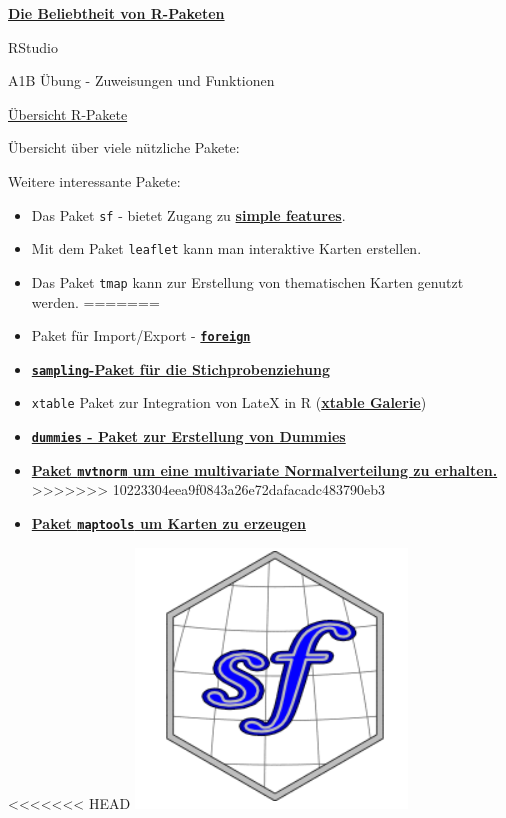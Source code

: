 \documentclass[ignorenonframetext,]{beamer}
\providecommand{\tightlist}{%
  \setlength{\itemsep}{0pt}\setlength{\parskip}{0pt}}
\begin{document}
\begin{frame}{\href{https://gallery.shinyapps.io/cran-gauge/}{\textbf{Die
Beliebtheit von R-Paketen}}}
\begin{frame}{RStudio}
\begin{frame}[fragile]{A1B Übung - Zuweisungen und Funktionen}
\begin{frame}{\href{https://www.youtube.com/watch?v=kKI9--Opmso}{Übersicht
R-Pakete}}
\begin{frame}[fragile]{Übersicht über viele nützliche Pakete:}
\begin{block}{Weitere interessante Pakete:}

\begin{itemize}
<<<<<<< HEAD
\tightlist
\item
  Das Paket \texttt{sf} - bietet Zugang zu
  \href{https://de.wikipedia.org/wiki/Simple_Feature_Access}{\textbf{simple
  features}}.
\item
  Mit dem Paket \texttt{leaflet} kann man interaktive Karten erstellen.
\item
  Das Paket \texttt{tmap} kann zur Erstellung von thematischen Karten
  genutzt werden.
=======
\item
  Paket für Import/Export -
  \href{http://cran.r-project.org/web/packages/foreign/foreign.pdf}{\textbf{\texttt{foreign}}}
\item
  \href{http://iase-web.org/documents/papers/icots8/ICOTS8_4J1_TILLE.pdf}{\textbf{\texttt{sampling}-Paket
  für die Stichprobenziehung}}
\item
  \texttt{xtable} Paket zur Integration von LateX in R
  (\href{http://cran.r-project.org/web/packages/xtable/vignettes/xtableGallery.pdf}{\textbf{xtable
  Galerie}})
\item
  \href{http://cran.r-project.org/web/packages/dummies/dummies.pdf}{\textbf{\texttt{dummies}
  - Paket zur Erstellung von Dummies}}
\item
  \href{http://cran.r-project.org/web/packages/mvtnorm/index.html}{\textbf{Paket
  \texttt{mvtnorm} um eine multivariate Normalverteilung zu erhalten. }}
>>>>>>> 10223304eea9f0843a26e72dafacadc483790eb3
\item
  \href{http://www.r-bloggers.com/tag/maptools/}{\textbf{Paket
  \texttt{maptools} um Karten zu erzeugen}}
\end{itemize}

<<<<<<< HEAD
\includegraphics{figure/logo_sf.PNG}


\end{block}
\end{frame}
\end{frame}
\end{frame}
\end{frame}
\end{frame}
\end{document}
